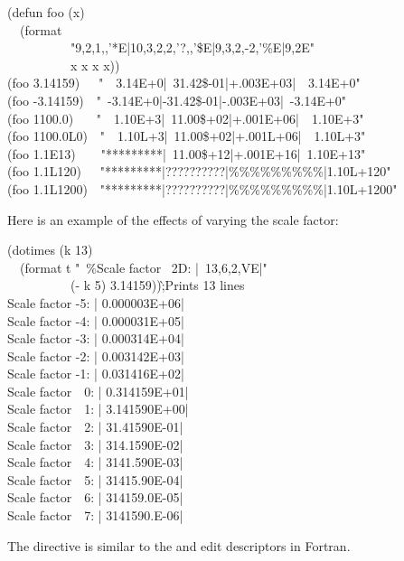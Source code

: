 \begin{flushdesc}
\begin{lisp}
(defun foo (x) \\
~~(format {\nil} \\
~~~~~~~~~~"{\Xtilde}9,2,1,,'*E|{\Xtilde}10,3,2,2,'?,,'\$E|{\Xtilde}9,3,2,-2,'\%{\Xatsign}E|{\Xtilde}9,2E" \\
~~~~~~~~~~x x x x)) \\
(foo 3.14159)~~\EV\ "~~3.14E+0|~31.42\$-01|+.003E+03|~~3.14E+0" \\
(foo -3.14159)~\EV\ "~-3.14E+0|-31.42\$-01|-.003E+03|~-3.14E+0" \\
(foo 1100.0) ~~\EV\ "~~1.10E+3|~11.00\$+02|+.001E+06|~~1.10E+3" \\
(foo 1100.0L0)~\EV\ "~~1.10L+3|~11.00\$+02|+.001L+06|~~1.10L+3" \\
(foo 1.1E13)~~~\EV\ "*********|~11.00\$+12|+.001E+16|~1.10E+13" \\
(foo 1.1L120)~~\EV\ "*********|??????????|\%\%\%\%\%\%\%\%\%|1.10L+120" \\
(foo 1.1L1200)~\EV\ "*********|??????????|\%\%\%\%\%\%\%\%\%|1.10L+1200"
\end{lisp}
Here is an example of the effects of varying the scale factor:
\begin{lisp}
(dotimes (k 13) \\
~~(format t "~\%Scale factor ~2D: |~13,6,2,VE|" \\
~~~~~~~~~~(- k 5) 3.14159))\`;\textrm{Prints 13 lines} \\
Scale factor -5: | 0.000003E+06| \\
Scale factor -4: | 0.000031E+05| \\
Scale factor -3: | 0.000314E+04| \\
Scale factor -2: | 0.003142E+03| \\
Scale factor -1: | 0.031416E+02| \\
Scale factor~~0: | 0.314159E+01| \\
Scale factor~~1: | 3.141590E+00| \\
Scale factor~~2: | 31.41590E-01| \\
Scale factor~~3: | 314.1590E-02| \\
Scale factor~~4: | 3141.590E-03| \\
Scale factor~~5: | 31415.90E-04| \\
Scale factor~~6: | 314159.0E-05| \\
Scale factor~~7: | 3141590.E-06|
\end{lisp}

\beforenoterule
\begin{incompatibility}
The  directive is similar to the
 and 
edit descriptors in Fortran.


\end{incompatibility}
\end{flushdesc}
